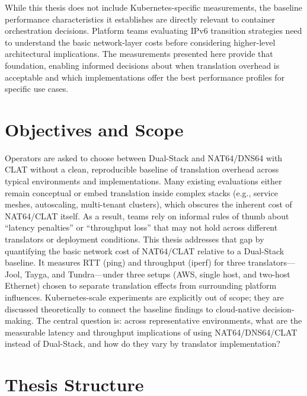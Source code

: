 While this thesis does not include Kubernetes-specific measurements, the baseline performance characteristics it establishes are directly relevant to container orchestration decisions. Platform teams evaluating IPv6 transition strategies need to understand the basic network-layer costs before considering higher-level architectural implications. The measurements presented here provide that foundation, enabling informed decisions about when translation overhead is acceptable and which implementations offer the best performance profiles for specific use cases.


\section{Objectives and Scope}
Operators are asked to choose between Dual-Stack and NAT64/DNS64 with CLAT without a clean, reproducible baseline of translation overhead across typical environments and implementations. Many existing evaluations either remain conceptual or embed translation inside complex stacks (e.g., service meshes, autoscaling, multi-tenant clusters), which obscures the inherent cost of NAT64/CLAT itself. As a result, teams rely on informal rules of thumb about “latency penalties” or “throughput loss” that may not hold across different translators or deployment conditions.
This thesis addresses that gap by quantifying the basic network cost of NAT64/CLAT relative to a Dual-Stack baseline. It measures RTT (ping) and throughput (iperf) for three translators—Jool, Tayga, and Tundra—under three setups (AWS, single host, and two-host Ethernet) chosen to separate translation effects from surrounding platform influences. Kubernetes-scale experiments are explicitly out of scope; they are discussed theoretically to connect the baseline findings to cloud-native decision-making.
The central question is: across representative environments, what are the measurable latency and throughput implications of using NAT64/DNS64/CLAT instead of Dual-Stack, and how do they vary by translator implementation?


\section{Thesis Structure}

